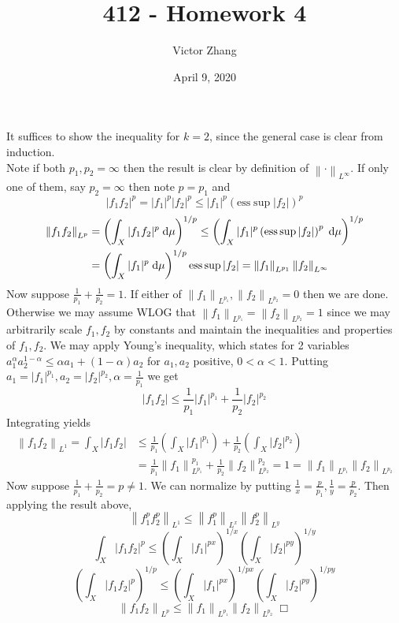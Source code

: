 \documentclass{article}
\title{412 - Homework 4}
\author{Victor Zhang}
\date{April 9, 2020}
\newcommand{\norm}[1]{\left\lVert#1\right\rVert}
\begin{document}
\maketitle

\section{}
It suffices to show the inequality for $k = 2$, since the general case is clear from induction.\\
Note if both $p_1, p_2 = \infty$ then the result is clear by definition of $\norm{\cdot}_{L^{\infty}}$. If only one of them, say $p_2 = \infty$ then note $p = p_1$ and
$$|f_1f_2|^p = |f_1|^p|f_2|^p \leq |f_1|^p\left( \text{ess}\sup |f_2|\right)^p$$
\begin{equation*}
    \begin{split}
        \norm{f_1f_2}_{L^{p}} &= \left(\int_X |f_1f_2|^p\textrm{\;d}\mu\right)^{1/p} \leq \left(\int_X |f_1|^p\left( \text{ess}\sup |f_2|\right)^p\textrm{\;d}\mu\right)^{1/p}\\
        &= \left(\int_X |f_1|^p\textrm{\;d}\mu\right)^{1/p} \text{ess}\sup |f_2| = \norm{f_1}_{L^{p_1}}\norm{f_2}_{L^{\infty}}
    \end{split}
\end{equation*}
Now suppose $\frac{1}{p_1} + \frac{1}{p_2} = 1$. If either of $\norm{f_1}_{L^{p_1}}, \norm{f_2}_{L^{p_2}} = 0$ then we are done. Otherwise we may assume WLOG that $\norm{f_1}_{L^{p_1}} = \norm{f_2}_{L^{p_2}} = 1$ since we may arbitrarily scale $f_1,f_2$ by constants and maintain the inequalities and properties of $f_1, f_2$. We may apply Young's inequality, which states for 2 variables $a_1^\alpha a_2^{1-\alpha} \leq \alpha a_1 + (1-\alpha)a_2$ for $a_1,a_2$ positive, $0 < \alpha < 1$. Putting $a_1 = |f_1|^{p_1}, a_2 = |f_2|^{p_2}, \alpha = \frac{1}{p_1}$ we get
$$|f_1f_2| \leq \frac{1}{p_1}|f_1|^{p_1} + \frac{1}{p_2}|f_2|^{p_2}$$
Integrating yields
\begin{equation*}
    \begin{split}
    \norm{f_1f_2}_{L^{1}} = \int_X |f_1f_2| &\leq \frac{1}{p_1}\left(\int_X|f_1|^{p_1}\right) + \frac{1}{p_2}\left(\int_X|f_2|^{p_2}\right)\\
    &= \frac{1}{p_1}\norm{f_1}_{L^{p_1}}^{p_1} + \frac{1}{p_2}\norm{f_2}_{L^{p_2}}^{p_2} = 1 = \norm{f_1}_{L^{p_1}}\norm{f_2}_{L^{p_2}}
    \end{split}
\end{equation*}
Now suppose $\frac{1}{p_1} + \frac{1}{p_2} = p \neq 1$. We can normalize by putting $\frac{1}{x} = \frac{p}{p_1}, \frac{1}{y} = \frac{p}{p_2}$. Then applying the result above,
$$\norm{f_1^pf_2^p}_{L^{1}} \leq \norm{f_1^p}_{L^{x}}\norm{f_2^p}_{L^{y}}$$
$$\int_X |f_1f_2|^p \leq \left(\int_X |f_1|^{px}\right)^{1/x}\left(\int_X |f_2|^{py}\right)^{1/y}$$
$$\left(\int_X |f_1f_2|^p\right)^{1/p} \leq \left(\int_X |f_1|^{px}\right)^{1/px}\left(\int_X |f_2|^{py}\right)^{1/py}$$
$$\norm{f_1f_2}_{L^{p}} \leq \norm{f_1}_{L^{p_1}}\norm{f_2}_{L^{p_2}} \; \Box$$
\end{document}
